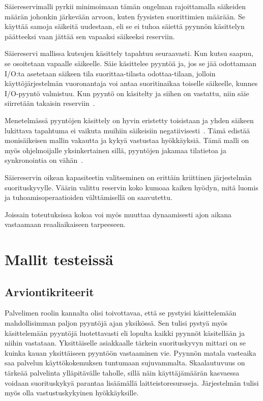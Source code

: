 \documentclass[12pt]{article}
\begin{document}
Säiereservimalli pyrkii minimoimaan tämän ongelman rajoittamalla
säikeiden määrän johonkin järkevään arvoon, kuten fyysisten suorittimien
määrään. Se käyttää samoja säikeitä uudestaan, eli se ei tuhoa säiettä
pyynnön käsittelyn päätteeksi vaan jättää sen vapaaksi säikeeksi reserviin.

Säiereservi mallissa kutsujen käsittely tapahtuu seuraavasti.
Kun kutsu saapuu, se osoitetaan vapaalle säikeelle. Säie käsittelee pyyntöä ja,
jos se jää odottamaan I/O:ta asetetaan säikeen tila suorittaa-tilasta odottaa-tilaan,
jolloin käyttöjärjestelmän vuoronantaja voi antaa suoritinaikaa toiselle säikeelle,
kunnes I/O-pyyntö valmistuu. Kun pyyntö on käsitelty ja siihen on vastattu, niin
säie siirretään takaisin reserviin~\cite{ling_analysis_2000}.

Menetelmässä pyyntöjen käsittely on hyvin eristetty toisistaan ja
yhden säikeen lukittava tapahtuma ei vaikuta muihiin säikeisiin negatiivisesti~\cite{davis_case_2017}.
Tämä edistää monisäikeisen mallin vakautta ja kykyä vastustaa hyökkäyksiä.
Tämä malli on myös ohjelmoijalle yksinkertainen sillä, pyyntöjen jakamaa tilatietoa
ja synkronointia on vähän~\cite{hu_applying_1998}.

Säiereservin oikean kapasiteetin valitseminen on erittäin kriittinen 
järjestelmän suorituskyvylle.
Väärin valittu reservin koko kumoaa kaiken hyödyn, mitä luomis
ja tuhoamisoperaatioiden välttämisellä on saavutettu.

Joissain toteutuksissa kokoa voi myös muuttaa dynaamisesti ajon aikana vastaamaan
reaaliaikaiseen tarpeeseen.

\section{Mallit testeissä}
\subsection{Arviontikriteerit}
Palvelimen roolin kannalta olisi toivottavaa, että
se pystyisi käsittelemään mahdollisimman paljon pyyntöjä
ajan yksikössä. Sen tulisi pystyä myös käsittelemään pyyntöjä
luotettavasti eli lopulta kaikki pyynnöt käsitellään ja niihin vastataan.
Yksittäiselle asiakkaalle tärkein suorituskyvyn mittari on se kuinka kauan
yksittäiseen pyyntöön vastaaminen vie. Pyynnön matala vasteaika saa
palvelun käyttökokemuksen tuntumaan sujuvammalta.
Skaalautuvuus on tärkeää palvelinta ylläpitävälle taholle, sillä
näin käyttäjämäärän kasvaessa voidaan suorituskykyä parantaa
lisäämällä laitteistoresursseja. Järjestelmän tulisi myös
olla vastustuskykyinen hyökkäyksille.
\end{document}
